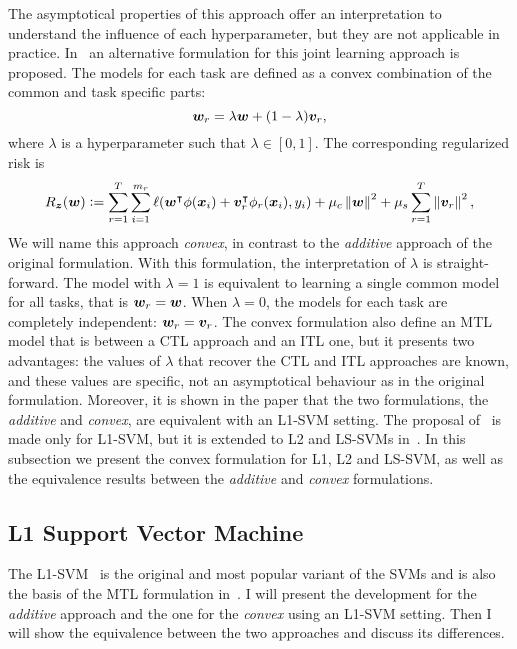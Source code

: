 The asymptotical properties of this approach offer an interpretation to understand the influence of each hyperparameter, but they are not applicable in practice.
In~\cite{RuizAD19} an alternative formulation for this joint learning approach is proposed. The models for each task are defined as a convex combination of the common and task specific parts:
\begin{equation}
    \nonumber
    \bm{w}_r = \lambda \bm{w} + (1 - \lambda) \bm{v}_r,
\end{equation}
where $\lambda$ is a hyperparameter such that $\lambda \in \left[0, 1\right]$.
The corresponding regularized risk is 
\begin{equation}
    \nonumber
    R_{\bm{z}} (\bm{w}) \vcentcolon= \sum_{r=1}^{T} \sum_{i=1}^{m_r} \ell(\bm{w}^\intercal {\phi(\bm{x}_i)} + \bm{v}_r^\intercal {\phi_r(\bm{x}_i)}, y_i) + \mu_c \left\lVert\bm{w}\right\rVert^2 + \mu_s \sum_{r=1}^T \left\lVert\bm{v}_r\right\rVert^2,
\end{equation}
We will name this approach \emph{convex}, in contrast to the \emph{additive} approach of the original formulation.
With this formulation, the interpretation of $\lambda$ is straight-forward. The model with $\lambda = 1$ is equivalent to learning a single common model for all tasks, that is $\bm{w}_r = \bm{w}$. When $\lambda=0$, the models for each task are completely independent: $\bm{w}_r = \bm{v}_r$.
The convex formulation also define an MTL model that is between a CTL approach and an ITL one, but it presents two advantages: the values of $\lambda$ that recover the CTL and ITL approaches are known, and these values are specific, not an asymptotical behaviour as in the original formulation. 
%
Moreover, it is shown in the paper that the two formulations, the \emph{additive} and \emph{convex}, are equivalent with an L1-SVM setting.
%
The proposal of~\cite{RuizAD19} is made only for L1-SVM, but it is extended to L2 and LS-SVMs in~\cite{RuizAD21}. In this subsection we present the convex formulation for L1, L2 and LS-SVM, as well as the equivalence results between the \emph{additive} and \emph{convex} formulations.




\subsection{L1 Support Vector Machine}
The L1-SVM~\cite{Vapnik00} is the original and most popular variant of the SVMs and is also the basis of the MTL formulation in~\cite{EvgeniouP04}.
I will present the development for the \emph{additive} approach and the one for the \emph{convex} using an L1-SVM setting. Then I will show the equivalence between the two approaches and discuss its differences.

